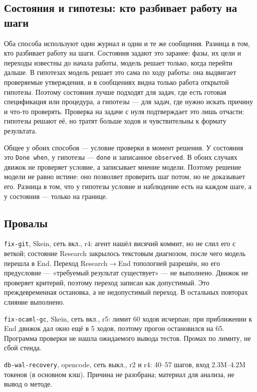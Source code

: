 \documentclass[11pt,a4paper]{article}
\begin{document}
\subsection{Состояния и гипотезы: кто разбивает работу на шаги}

Оба способа используют один журнал и одни и те же сообщения. Разница в том, кто разбивает
работу на шаги. Состояния задают это заранее: фазы, их цели и переходы известны до начала
работы, модель решает только, когда перейти дальше. В гипотезах модель решает это сама по ходу
работы: она выдвигает проверяемые утверждения, и в сообщениях видна только работа открытой
гипотезы. Поэтому состояния лучше подходят для задач, где есть готовая спецификация или
процедура, а гипотезы --- для задач, где нужно искать причину и что-то проверять. Проверка на
задаче с нуля подтверждает это лишь отчасти: гипотезы решают её, но тратят больше ходов и
чувствительны к формату результата.

Общее у обоих способов --- условие проверки в момент решения. У состояния это
\texttt{Done when}, у гипотезы --- \texttt{done} и записанное \texttt{observed}. В обоих
случаях движок не проверяет условие, а записывает мнение модели. Поэтому решение модели не
равно истине: оно позволяет проверить шаг потом, но не доказывает его. Разница в том, что у
гипотезы условие и наблюдение есть на каждом шаге, а у состояния --- только на границе.

\subsection{Провалы}

\texttt{fix-git}, Skein, сеть вкл., r4: агент нашёл висячий коммит, но не слил его с
веткой; состояние Research закрылось текстовым диагнозом, после чего модель перешла в End.
Переход Research$\rightarrow$End топологией разрешён, но его предусловие --- «требуемый
результат существует» --- не выполнено. Движок не проверяет критерий, поэтому переход
записан как допустимый. Это преждевременная остановка, а не недопустимый переход. В
остальных повторах слияние выполнено.

\texttt{fix-ocaml-gc}, Skein, сеть вкл., r5: лимит 60 ходов исчерпан; при приближении к End
движок дал окно ещё в 5 ходов, поэтому прогон остановился на 65. Программа проверки не нашла
ожидаемого вывода тестов. Промах по лимиту, не сбой стенда.

\texttt{db-wal-recovery}, opencode, сеть выкл., r2 и r4: 40--57 шагов, вход 2.3M--4.2M
токенов (в основном кэш). Причина не разобрана; материал для анализа, не вывод о методе.
\end{document}
